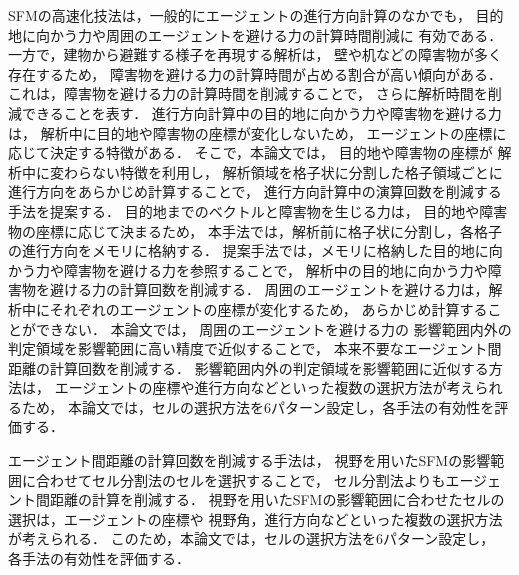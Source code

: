 SFMの高速化技法は，一般的にエージェントの進行方向計算のなかでも，
目的地に向かう力や周囲のエージェントを避ける力の計算時間削減に
有効である．一方で，建物から避難する様子を再現する解析は，
壁や机などの障害物が多く存在するため，
障害物を避ける力の計算時間が占める割合が高い傾向がある．
これは，障害物を避ける力の計算時間を削減することで，
さらに解析時間を削減できることを表す．
進行方向計算中の目的地に向かう力や障害物を避ける力は，
解析中に目的地や障害物の座標が変化しないため，
エージェントの座標に応じて決定する特徴がある．
そこで，本論文では，
目的地や障害物の座標が
解析中に変わらない特徴を利用し，
解析領域を格子状に分割した格子領域ごとに進行方向をあらかじめ計算することで，
進行方向計算中の演算回数を削減する手法を提案する．
目的地までのベクトルと障害物を生じる力は，
目的地や障害物の座標に応じて決まるため，
本手法では，解析前に格子状に分割し，各格子の進行方向をメモリに格納する．
提案手法では，メモリに格納した目的地に向かう力や障害物を避ける力を参照することで，
解析中の目的地に向かう力や障害物を避ける力の計算回数を削減する．
周囲のエージェントを避ける力は，解析中にそれぞれのエージェントの座標が変化するため，
あらかじめ計算することができない．
本論文では，
周囲のエージェントを避ける力の
影響範囲内外の判定領域を影響範囲に高い精度で近似することで，
本来不要なエージェント間距離の計算回数を削減する．
影響範囲内外の判定領域を影響範囲に近似する方法は，
エージェントの座標や進行方向などといった複数の選択方法が考えられるため，
本論文では，セルの選択方法を6パターン設定し，各手法の有効性を評価する．

エージェント間距離の計算回数を削減する手法は，
視野を用いたSFMの影響範囲に合わせてセル分割法のセルを選択することで，
セル分割法よりもエージェント間距離の計算を削減する．
視野を用いたSFMの影響範囲に合わせたセルの選択は，エージェントの座標や
視野角，進行方向などといった複数の選択方法が考えられる．
このため，本論文では，セルの選択方法を6パターン設定し，
各手法の有効性を評価する．
\fi 


